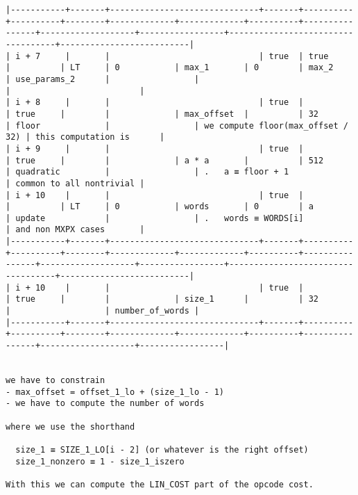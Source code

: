 \documentclass[varwidth=\maxdimen,margin=0.5cm,multi={verbatim}]{standalone}
\begin{document}
\begin{verbatim}
|-----------+-------+------------------------------+-------+----------+----------+--------+-------------+-------------+----------+----------------+-------------------+-----------------+-----------------------------------+--------------------------|
| i + 7     |       |                              | true  | true     |          | LT     | 0           | max_1       | 0        | max_2          | use_params_2      |                 |                                   |                          |
| i + 8     |       |                              | true  |          | true     |        |             | max_offset  |          | 32             | floor             |                 | we compute floor(max_offset / 32) | this computation is      |
| i + 9     |       |                              | true  |          | true     |        |             | a * a       |          | 512            | quadratic         |                 | .   a ≡ floor + 1                 | common to all nontrivial |
| i + 10    |       |                              | true  |          |          | LT     | 0           | words       | 0        | a              | update            |                 | .   words ≡ WORDS[i]              | and non MXPX cases       |
|-----------+-------+------------------------------+-------+----------+----------+--------+-------------+-------------+----------+----------------+-------------------+-----------------+-----------------------------------+--------------------------|
| i + 10    |       |                              | true  |          | true     |        |             | size_1      |          | 32             |                   | number_of_words |
|-----------+-------+------------------------------+-------+----------+----------+--------+-------------+-------------+----------+----------------+-------------------+-----------------|


we have to constrain
- max_offset = offset_1_lo + (size_1_lo - 1)
- we have to compute the number of words

where we use the shorthand

  size_1 ≡ SIZE_1_LO[i - 2] (or whatever is the right offset)
  size_1_nonzero ≡ 1 - size_1_iszero

With this we can compute the LIN_COST part of the opcode cost.



\end{verbatim}
\end{document}

